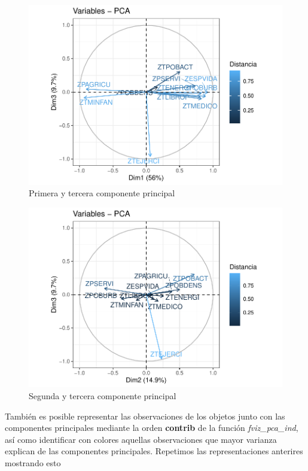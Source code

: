 \documentclass[12pt,twoside]{report}
\begin{document}
\begin{figure}[H]
\includegraphics[width=\textwidth]{../code/figures/primera_tercera.pdf}
\caption{Primera y tercera componente principal}
\label{fig:primera_tercera}
\end{figure} 

\begin{figure}[H]
\includegraphics[width=\textwidth]{../code/figures/segunda_tercera.pdf}
\caption{Segunda y tercera componente principal}
\label{fig:segunda_tercera}
\end{figure} 

También es posible representar las observaciones de los objetos junto con las componentes principales mediante la orden \textbf{contrib} de la función \textit{fviz\_pca\_ind}, así como identificar con colores aquellas observaciones que mayor varianza explican de las componentes principales. Repetimos las representaciones anterires mostrando esto
\end{document}
